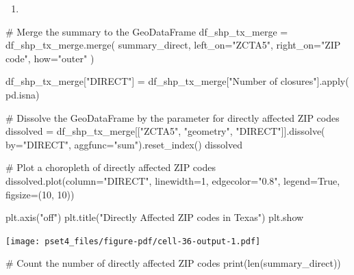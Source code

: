 \documentclass[
  letterpaper,
  DIV=11,
  numbers=noendperiod]{scrartcl}
\newenvironment{Shaded}{\begin{snugshade}}{\end{snugshade}}
\newcommand{\BuiltInTok}[1]{\textcolor[rgb]{0.00,0.23,0.31}{#1}}
\newcommand{\CommentTok}[1]{\textcolor[rgb]{0.37,0.37,0.37}{#1}}
\newcommand{\DecValTok}[1]{\textcolor[rgb]{0.68,0.00,0.00}{#1}}
\newcommand{\NormalTok}[1]{\textcolor[rgb]{0.00,0.23,0.31}{#1}}
\newcommand{\OperatorTok}[1]{\textcolor[rgb]{0.37,0.37,0.37}{#1}}
\newcommand{\StringTok}[1]{\textcolor[rgb]{0.13,0.47,0.30}{#1}}
\newcommand{\VariableTok}[1]{\textcolor[rgb]{0.07,0.07,0.07}{#1}}
\providecommand{\tightlist}{%
  \setlength{\itemsep}{0pt}\setlength{\parskip}{0pt}}\usepackage{longtable,booktabs,array}
\begin{document}
\begin{enumerate}
\def\labelenumi{\arabic{enumi}.}
\setcounter{enumi}{1}
\tightlist
\item
\end{enumerate}

\begin{Shaded}
\begin{Highlighting}[]
\CommentTok{\# Merge the summary to the GeoDataFrame}
\NormalTok{df\_shp\_tx\_merge }\OperatorTok{=}\NormalTok{ df\_shp\_tx\_merge.merge(}
\NormalTok{    summary\_direct,}
\NormalTok{    left\_on}\OperatorTok{=}\StringTok{"ZCTA5"}\NormalTok{,}
\NormalTok{    right\_on}\OperatorTok{=}\StringTok{"ZIP code"}\NormalTok{,}
\NormalTok{    how}\OperatorTok{=}\StringTok{"outer"}
\NormalTok{)}

\NormalTok{df\_shp\_tx\_merge[}\StringTok{"DIRECT"}\NormalTok{] }\OperatorTok{=}\NormalTok{ df\_shp\_tx\_merge[}\StringTok{"Number of closures"}\NormalTok{].}\BuiltInTok{apply}\NormalTok{(}
\NormalTok{    pd.isna)}

\CommentTok{\# Dissolve the GeoDataFrame by the parameter for directly affected ZIP codes}
\NormalTok{dissolved }\OperatorTok{=}\NormalTok{ df\_shp\_tx\_merge[[}\StringTok{"ZCTA5"}\NormalTok{, }\StringTok{"geometry"}\NormalTok{, }\StringTok{"DIRECT"}\NormalTok{]].dissolve(}
\NormalTok{    by}\OperatorTok{=}\StringTok{"DIRECT"}\NormalTok{, aggfunc}\OperatorTok{=}\StringTok{"sum"}\NormalTok{).reset\_index()}
\NormalTok{dissolved}

\CommentTok{\# Plot a choropleth of directly affected ZIP codes}
\NormalTok{dissolved.plot(column}\OperatorTok{=}\StringTok{"DIRECT"}\NormalTok{, linewidth}\OperatorTok{=}\DecValTok{1}\NormalTok{, edgecolor}\OperatorTok{=}\StringTok{"0.8"}\NormalTok{,}
\NormalTok{               legend}\OperatorTok{=}\VariableTok{True}\NormalTok{, figsize}\OperatorTok{=}\NormalTok{(}\DecValTok{10}\NormalTok{, }\DecValTok{10}\NormalTok{))}

\NormalTok{plt.axis(}\StringTok{"off"}\NormalTok{)}
\NormalTok{plt.title(}\StringTok{"Directly Affected ZIP codes in Texas"}\NormalTok{)}
\NormalTok{plt.show}
\end{Highlighting}
\end{Shaded}

\texttt{[image: pset4\_files/figure-pdf/cell-36-output-1.pdf]}

\begin{Shaded}
\begin{Highlighting}[]
\CommentTok{\# Count the number of directly affected ZIP codes}
\BuiltInTok{print}\NormalTok{(}\BuiltInTok{len}\NormalTok{(summary\_direct))}
\end{Highlighting}
\end{Shaded}
\end{document}
